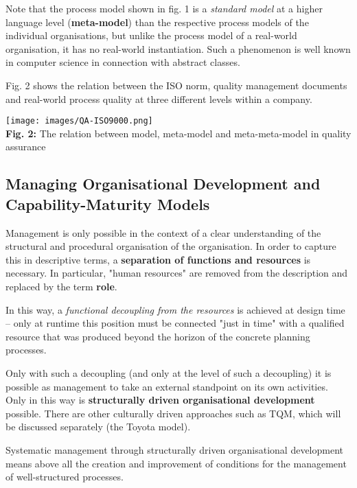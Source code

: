 \documentclass[11pt,a4paper]{article}
\begin{document}
Note that the process model shown in fig. 1 is a \emph{standard model} at a
higher language level (\textbf{meta-model}) than the respective process models
of the individual organisations, but unlike the process model of a real-world
organisation, it has no real-world instantiation. Such a phenomenon is well
known in computer science in connection with abstract classes.

Fig. 2 shows the relation between the ISO norm, quality management documents
and real-world process quality at three different levels within a company.  

\begin{center}
  \texttt{[image: images/QA-ISO9000.png]}\\ \textbf{Fig. 2:}
  The relation between model, meta-model and meta-meta-model in quality
  assurance
\end{center}

\subsection{Managing Organisational Development and\\ Capability-Maturity
  Models} 

Management is only possible in the context of a clear understanding of the
structural and procedural organisation of the organisation.  In order to
capture this in descriptive terms, a \textbf{separation of functions and
  resources} is necessary. In particular, "human resources" are removed from
the description and replaced by the term \textbf{role}.

In this way, a \emph{functional decoupling from the resources} is achieved at
design time -- only at runtime this position must be connected "just in time"
with a qualified resource that was produced beyond the horizon of the concrete
planning processes.

Only with such a decoupling (and only at the level of such a decoupling) it is
possible as management to take an external standpoint on its own activities.
Only in this way is \textbf{structurally driven organisational development}
possible. There are other culturally driven approaches such as TQM, which will
be discussed separately (the Toyota model).

Systematic management through structurally driven organisational development
means above all the creation and improvement of conditions for the management
of well-structured processes.
\end{document}
